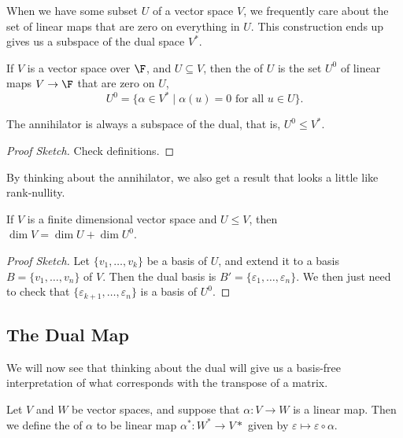 \documentclass[a4paper]{scrartcl}
\begin{document}
When we have some subset $U$ of a vector space $V$, we frequently care about the set of linear maps that are zero on everything in $U$. This construction ends up gives us a subspace of the dual space $V^*$.


\begin{definition}[Annihilator]
    If $V$ is a vector space over $\F$, and $U \subseteq V$, then the  of $U$ is the set $U^0$ of linear maps $V \rightarrow \F$ that are zero on $U$,
    $$
    U^0 = \{ \alpha \in V^* \mid \alpha(u) = 0 \text{ for all }u \in U\}.
    $$
\end{definition}

\begin{lemma}
    The annihilator is always a subspace of the dual, that is, $U^0 \leq V^*$.
\end{lemma}
\begin{proof}[Proof Sketch]    
    Check definitions.
\end{proof}

By thinking about the annihilator, we also get a result that looks a little like rank-nullity.

\begin{lemma}
    If $V$ is a finite dimensional vector space and $U \leq V$, then $\dim V = \dim U + \dim U^0$.
\end{lemma}
\begin{proof}[Proof Sketch]
    Let $\{v_1, \dots, v_k\}$ be a basis of $U$, and extend it to a basis $B = \{v_1, \dots, v_n\}$ of $V$. Then the dual basis is $B' = \{\varepsilon_1, \dots, \varepsilon_n\}$.
    We then just need to check that $\{\varepsilon_{k + 1}, \dots, \varepsilon_n\}$ is a basis of $U^0$.
\end{proof}

\subsection{The Dual Map}

We will now see that thinking about the dual will give us a basis-free interpretation of what corresponds with the transpose of a matrix.

\begin{definition}
    Let $V$ and $W$ be vector spaces, and suppose that $\alpha: V \rightarrow W$ is a linear map. Then we define the  of $\alpha$ to be linear map $\alpha^*: W^* \rightarrow V*$ given by $\varepsilon \mapsto \varepsilon \circ \alpha$.
\end{definition}
\end{document}
